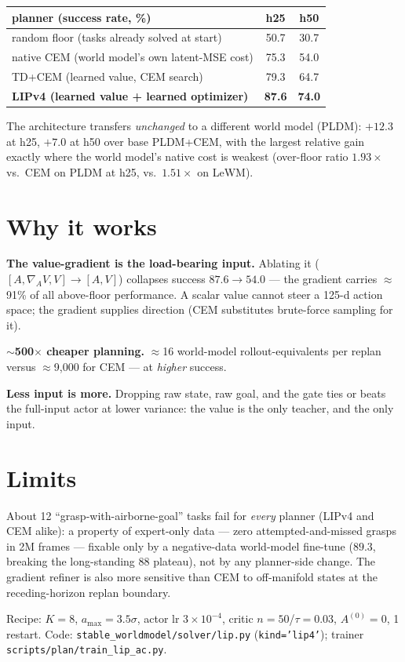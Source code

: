 \documentclass[11pt]{article}
\newcommand{\code}[1]{\texttt{\small #1}}
\begin{document}
\begin{center}
\begin{tabular}{lcc}
\toprule
planner (success rate, \%) & h25 & h50 \\
\midrule
random floor (tasks already solved at start) & 50.7 & 30.7 \\
native CEM (world model's own latent-MSE cost) & 75.3 & 54.0 \\
TD+CEM (learned value, CEM search) & 79.3 & 64.7 \\
\textbf{LIPv4 (learned value + learned optimizer)} & \textbf{87.6} & \textbf{74.0} \\
\bottomrule
\end{tabular}
\end{center}

\vspace{-2pt}
The architecture transfers \emph{unchanged} to a different world model (PLDM): $+12.3$ at h25, $+7.0$ at h50 over base PLDM+CEM, with the largest relative gain exactly where the world model's native cost is weakest (over-floor ratio $1.93\times$ vs.\ CEM on PLDM at h25, vs.\ $1.51\times$ on LeWM).

\section*{Why it works}
\textbf{The value-gradient is the load-bearing input.} Ablating it ($[A,\nabla_{\!A}V,V]\!\to\![A,V]$) collapses success $87.6\!\to\!54.0$ --- the gradient carries $\approx$91\% of all above-floor performance. A scalar value cannot steer a 125-d action space; the gradient supplies direction (CEM substitutes brute-force sampling for it).

\textbf{$\sim$500$\times$ cheaper planning.} $\approx$16 world-model rollout-equivalents per replan versus $\approx$9{,}000 for CEM --- at \emph{higher} success.

\textbf{Less input is more.} Dropping raw state, raw goal, and the gate ties or beats the full-input actor at lower variance: the value is the only teacher, and the only input.

\section*{Limits}
About 12 ``grasp-with-airborne-goal'' tasks fail for \emph{every} planner (LIPv4 and CEM alike): a property of expert-only data --- zero attempted-and-missed grasps in 2M frames --- fixable only by a negative-data world-model fine-tune ($89.3$, breaking the long-standing 88 plateau), not by any planner-side change. The gradient refiner is also more sensitive than CEM to off-manifold states at the receding-horizon replan boundary.

\vfill
{\footnotesize\color{black!55}
Recipe: $K{=}8$, $a_{\max}{=}3.5\sigma$, actor lr $3\!\times\!10^{-4}$, critic $n{=}50$/$\tau{=}0.03$, $A^{(0)}{=}0$, 1 restart.\quad
Code: \code{stable\_worldmodel/solver/lip.py} (\code{kind='lip4'}); trainer \code{scripts/plan/train\_lip\_ac.py}.}
\end{document}
